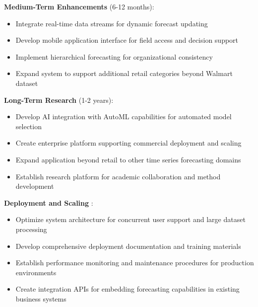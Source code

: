 \textbf{Medium-Term Enhancements } (6-12 months):
\begin{itemize}
	\item Integrate real-time data streams for dynamic forecast updating
	\item Develop mobile application interface for field access and decision support
	\item Implement hierarchical forecasting for organizational consistency
	\item Expand system to support additional retail categories beyond Walmart dataset
\end{itemize}

\textbf{Long-Term Research } (1-2 years):
\begin{itemize}
	\item Develop AI integration with AutoML capabilities for automated model selection
	\item Create enterprise platform supporting commercial deployment and scaling
	\item Expand application beyond retail to other time series forecasting domains
	\item Establish research platform for academic collaboration and method development
\end{itemize}

\textbf{Deployment and Scaling }:
\begin{itemize}
	\item Optimize system architecture for concurrent user support and large dataset processing
	\item Develop comprehensive deployment documentation and training materials
	\item Establish performance monitoring and maintenance procedures for production environments
	\item Create integration APIs for embedding forecasting capabilities in existing business systems
\end{itemize}